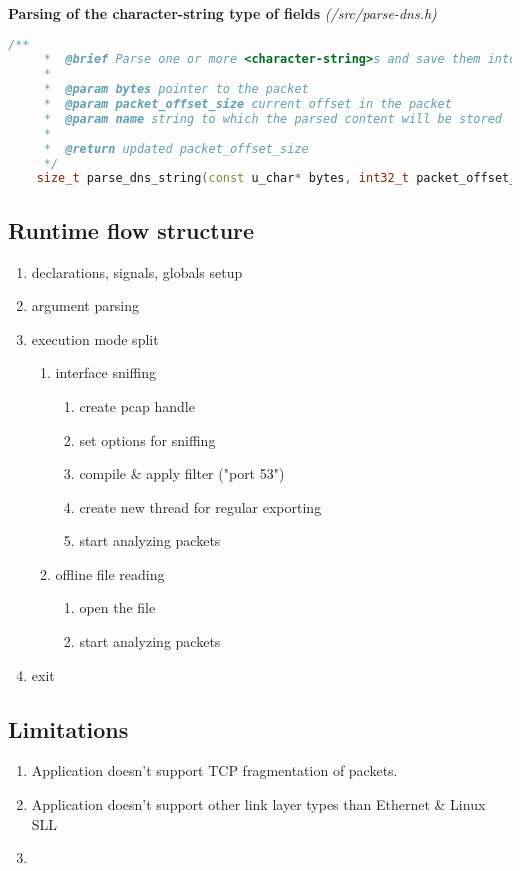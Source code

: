 \vspace{1cm}
\textbf{Parsing of the character-string type of fields} \textit{(/src/parse-dns.h)}
\begin{lstlisting}[language=C++]
    /**
     *  @brief Parse one or more <character-string>s and save them into a string
     * 
     *  @param bytes pointer to the packet
     *  @param packet_offset_size current offset in the packet
     *  @param name string to which the parsed content will be stored
     * 
     *  @return updated packet_offset_size
     */
    size_t parse_dns_string(const u_char* bytes, int32_t packet_offset_size, std::string &name);
\end{lstlisting}

\pagebreak

\subsection{Runtime flow structure}

\begin{enumerate}
\item declarations, signals, globals setup
\item argument parsing
\item execution mode split
\begin{enumerate}[label=(\alph*)]
\item interface sniffing
\begin{enumerate}
\item create pcap handle
\item set options for sniffing
\item compile \& apply filter ("port 53")
\item create new thread for regular exporting
\item start analyzing packets
\end{enumerate}
\item offline file reading
\begin{enumerate}
\item open the file
\item start analyzing packets
\end{enumerate}
\end{enumerate}
\item exit
\end{enumerate}

\subsection{Limitations}

\begin{enumerate}
\item Application doesn't support TCP fragmentation of packets.
\item Application doesn't support other link layer types than Ethernet \& Linux SLL
\item 
\end{enumerate}